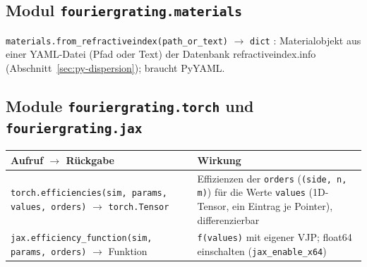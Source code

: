 \subsection{Modul \texttt{fouriergrating.materials}}
\texttt{materials.from\_refractiveindex(path\_or\_text)} $\to$ \texttt{dict}%
: Materialobjekt aus einer YAML-Datei (Pfad oder Text)
der Datenbank refractiveindex.info (Abschnitt~\ref{sec:py-dispersion}); braucht PyYAML.

\subsection{Module \texttt{fouriergrating.torch} und \texttt{fouriergrating.jax}}
\begin{center}
\small
\begin{tabularx}{\linewidth}{>{\raggedright\arraybackslash}p{6.4cm}Y}
\toprule
Aufruf $\to$ Rückgabe & Wirkung \\
\midrule
\texttt{torch.efficiencies(sim, params, values, orders)} $\to$ \texttt{torch.Tensor}%
 & Effizienzen der \texttt{orders} (\texttt{(side, n, m)}) für die Werte
\texttt{values} (1D-Tensor, ein Eintrag je Pointer), differenzierbar \\
\texttt{jax.efficiency\_function(sim, params, orders)} $\to$ Funktion%
 & \texttt{f(values)} mit eigener VJP; float64 einschalten
(\texttt{jax\_enable\_x64}) \\
\bottomrule
\end{tabularx}
\end{center}

